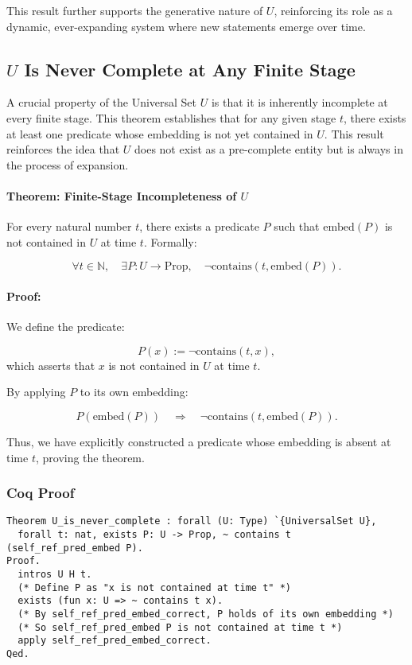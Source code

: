 \documentclass[12pt]{article}
\begin{document}
This result further supports the generative nature of \( U \), reinforcing its role as a dynamic, ever-expanding system where new statements emerge over time.


\subsection{\( U \) Is Never Complete at Any Finite Stage}

A crucial property of the Universal Set \( U \) is that it is inherently incomplete at every finite stage. This theorem establishes that for any given stage \( t \), there exists at least one predicate whose embedding is not yet contained in \( U \). This result reinforces the idea that \( U \) does not exist as a pre-complete entity but is always in the process of expansion.

\paragraph{Theorem: Finite-Stage Incompleteness of \( U \)}
For every natural number \( t \), there exists a predicate \( P \) such that \( \text{embed}(P) \) is not contained in \( U \) at time \( t \). Formally:

\begin{equation}
    \forall t \in \mathbb{N}, \quad \exists P: U \to \text{Prop}, \quad \neg \text{contains}(t, \text{embed}(P)).
\end{equation}

\paragraph{Proof:}
We define the predicate:

\begin{equation}
    P(x) := \neg \text{contains}(t, x),
\end{equation}
which asserts that \( x \) is not contained in \( U \) at time \( t \).

By applying \( P \) to its own embedding:

\begin{equation}
    P(\text{embed}(P)) \quad \Rightarrow \quad \neg \text{contains}(t, \text{embed}(P)).
\end{equation}

Thus, we have explicitly constructed a predicate whose embedding is absent at time \( t \), proving the theorem.

\subsubsection{Coq Proof}
\begin{lstlisting}[language=Coq]
Theorem U_is_never_complete : forall (U: Type) `{UniversalSet U},
  forall t: nat, exists P: U -> Prop, ~ contains t (self_ref_pred_embed P).
Proof.
  intros U H t.
  (* Define P as "x is not contained at time t" *)
  exists (fun x: U => ~ contains t x).
  (* By self_ref_pred_embed_correct, P holds of its own embedding *)
  (* So self_ref_pred_embed P is not contained at time t *)
  apply self_ref_pred_embed_correct.
Qed.
\end{lstlisting}
\end{document}
